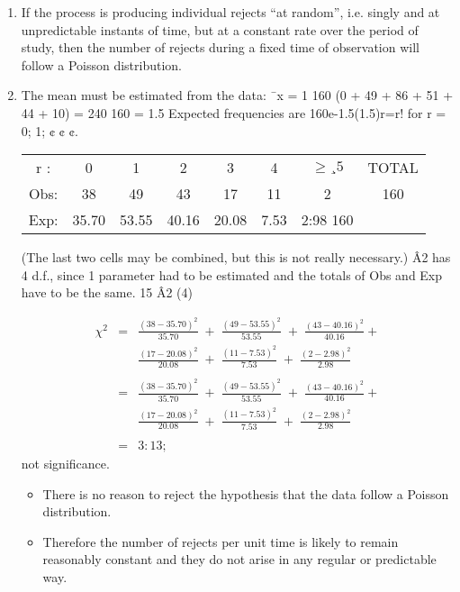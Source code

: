 \documentclass[a4paper,12pt]{article}
\begin{document}
\begin{enumerate}
\item If the process is producing individual rejects “at random”, i.e. singly and
at unpredictable instants of time, but at a constant rate over the period
of study, then the number of rejects during a fixed time of observation will
follow a Poisson distribution.
\item The mean must be estimated from the data:
¯x =
1
160
(0 + 49 + 86 + 51 + 44 + 10) =
240
160
= 1.5
Expected frequencies are 160e-1.5(1.5)r=r! for r = 0; 1; ¢ ¢ ¢.

\begin{center}
\begin{tabular}{cc|cc|cc|cc}
r : &0 & 1 & 2 & 3 & 4 & $\geq¸ 5$ & TOTAL\\
Obs:& 38 & 49 & 43 & 17 & 11 & 2&  160\\
Exp: &35.70& 53.55& 40.16 & 20.08 & 7.53&  2:98 160 \\
\end{tabular}
\end{center}
(The last two cells may be combined, but this is not really necessary.)
Â2 has 4 d.f., since 1 parameter had to be estimated and the totals of Obs
and Exp have to be the same.
15
Â2
(4) 

\begin{eqnarray*}
\chi^2 &=& \frac{(38-35.70)^2}{35.70} \;+\; \frac{(49-53.55)^2}{53.55} \;+\; \frac{(43-40.16)^2}{40.16} +\\ 
& & \frac{(17-20.08)^2}{20.08} \;+\; \frac{(11-7.53)^2}{7.53} \;+\; \frac{(2-2.98)^2}{2.98}\\\\
&=& \frac{(38-35.70)^2}{35.70} \;+\; \frac{(49-53.55)^2}{53.55} \;+\; \frac{(43-40.16)^2}{40.16} +  \\ 
& &  \frac{(17-20.08)^2}{20.08} \;+\; \frac{(11-7.53)^2}{7.53} \;+\; \frac{(2-2.98)^2}{2.98}\\\\
&=& 3:13;
\end{eqnarray*}
not significance.
\begin{itemize}
\item There is no reason to reject the hypothesis that the data follow a Poisson
distribution. 
\item Therefore the number of rejects per unit time is likely to remain
reasonably constant and they do not arise in any regular or predictable way.
\end{itemize}
\end{enumerate}
\end{document}

